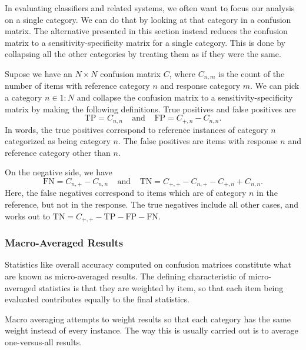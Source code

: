 In evaluating classifiers and related systems, we often want to focus
our analysis on a single category.  We can do that by looking at that
category in a confusion matrix.  The alternative presented in this
section instead reduces the confusion matrix to a
sensitivity-specificity matrix for a single category.  This is done by
collapsing all the other categories by treating them as if they were
the same.

Supose we have an $N \times N$ confusion matrix $C$, where $C_{n,m}$
is the count of the number of items with reference category $n$ and
response category $m$.  We can pick a category $n \in 1{:}N$ and
collapse the confusion matrix to a sensitivity-specificity matrix by
making the following definitions.  True positives and false positives
are
%
\begin{equation}
\mbox{TP} = C_{n,n}
\ \ \ \ \ \mbox{and} \ \ \ \ \
\mbox{FP} = C_{+,n} - C_{n,n}.
\end{equation}
%
In words, the true positives correspond to reference instances of
category $n$ categorized as being category $n$.  The false positives
are items with response $n$ and reference category other than $n$.

On the negative side, we have
%
\begin{equation}
\mbox{FN} = C_{n,+} - C_{n,n}
\ \ \ \ \ \mbox{and} \ \ \ \ \
\mbox{TN} = C_{+,+} - C_{n,+} - C_{+,n} + C_{n,n}.
\end{equation}
%
Here, the false negatives correspond to items which are of category
$n$ in the reference, but not in the response.  The true negatives
include all other cases, and works out to $\mbox{TN} = C_{+,+} -
\mbox{TP} - \mbox{FP} - \mbox{FN}$.


\subsubsection{Macro-Averaged Results}

Statistics like overall accuracy computed on confusion matrices
constitute what are known as micro-averaged results.  The defining
characteristic of micro-averaged statistics is that they are
weighted by item, so that each item being evaluated contributes
equally to the final statistics.

Macro averaging attempts to weight results so that each category has
the same weight instead of every instance.  The way this is usually
carried out is to average one-versus-all results. 

